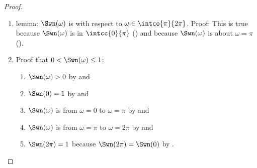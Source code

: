 \begin{proof}
\begin{enumerate}
  \item lemma: $\Swn(\omega)$ is  with respect to $\omega\in\intco{\pi}{2\pi}$.
        \label{ilem:Nriesz_Gincreasing}
        Proof: This is true because
               $\Swn(\omega)$ is  in $\intcc{0}{\pi}$ () and
               because $\Swn(\omega)$ is  about $\omega=\pi$ ().

  \item Proof that $0<\Swn(\omega) \le 1$: \label{item:Nriesz_01}
    \begin{enumerate}
      \item $\Swn(\omega)>0$ by  and
      \item $\Swn(0)=1$ by  and
      \item $\Swn(\omega)$ is  from $\omega=0$ to $\omega=\pi$ by  and
      \item $\Swn(\omega)$ is  from $\omega=\pi$ to $\omega=2\pi$ by  and
      \item $\Swn(2\pi)=1$ because $\Swn(2\pi)=\Swn(0)$ by .
     \end{enumerate}

\end{enumerate}
\end{proof}

